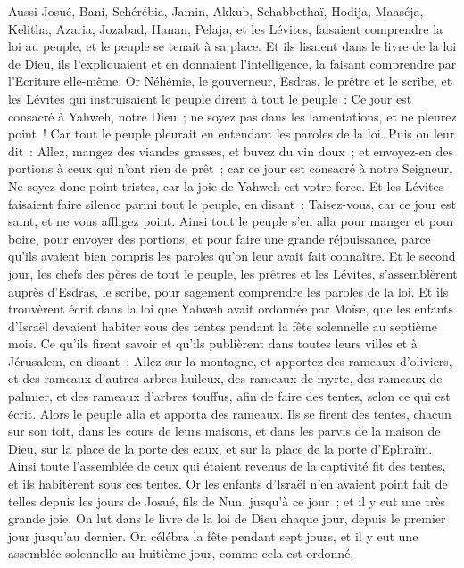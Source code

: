 \begin{multicols}{2}
Aussi Josué, Bani, Schérébia, Jamin, Akkub, Schabbethaï, Hodija, Maaséja, Kelitha, Azaria, Jozabad, Hanan, Pelaja, et les Lévites, faisaient comprendre la loi au peuple, et le peuple se tenait à sa place.
Et ils lisaient dans le livre de la loi de Dieu, ils l'expliquaient et en donnaient l'intelligence, la faisant comprendre par l'Ecriture elle-même.
Or Néhémie, le gouverneur, Esdras, le prêtre et le scribe, et les Lévites qui instruisaient le peuple dirent à tout le peuple~: Ce jour est consacré à Yahweh, notre Dieu~; ne soyez pas dans les lamentations, et ne pleurez point~! Car tout le peuple pleurait en entendant les paroles de la loi.
Puis on leur dit~: Allez, mangez des viandes grasses, et buvez du vin doux~; et envoyez-en des portions à ceux qui n'ont rien de prêt~; car ce jour est consacré à notre Seigneur. Ne soyez donc point tristes, car la joie de Yahweh est votre force.
Et les Lévites faisaient faire silence parmi tout le peuple, en disant~: Taisez-vous, car ce jour est saint, et ne vous affligez point.
Ainsi tout le peuple s'en alla pour manger et pour boire, pour envoyer des portions, et pour faire une grande réjouissance, parce qu'ils avaient bien compris les paroles qu'on leur avait fait connaître.
Et le second jour, les chefs des pères de tout le peuple, les prêtres et les Lévites, s'assemblèrent auprès d'Esdras, le scribe, pour sagement comprendre les paroles de la loi.
Et ils trouvèrent écrit dans la loi que Yahweh avait ordonnée par Moïse, que les enfants d'Israël devaient habiter sous des tentes pendant la fête solennelle au septième mois.
Ce qu'ils firent savoir et qu'ils publièrent dans toutes leurs villes et à Jérusalem, en disant~: Allez sur la montagne, et apportez des rameaux d'oliviers, et des rameaux d'autres arbres huileux, des rameaux de myrte, des rameaux de palmier, et des rameaux d'arbres touffus, afin de faire des tentes, selon ce qui est écrit.
Alors le peuple alla et apporta des rameaux. Ils se firent des tentes, chacun sur son toit, dans les cours de leurs maisons, et dans les parvis de la maison de Dieu, sur la place de la porte des eaux, et sur la place de la porte d'Ephraïm.
Ainsi toute l'assemblée de ceux qui étaient revenus de la captivité fit des tentes, et ils habitèrent sous ces tentes. Or les enfants d'Israël n'en avaient point fait de telles depuis les jours de Josué, fils de Nun, jusqu'à ce jour~; et il y eut une très grande joie.
On lut dans le livre de la loi de Dieu chaque jour, depuis le premier jour jusqu'au dernier. On célébra la fête pendant sept jours, et il y eut une assemblée solennelle au huitième jour, comme cela est ordonné.

\end{multicols}
